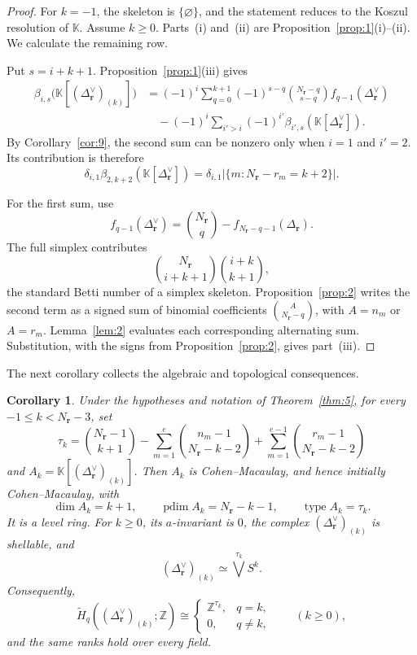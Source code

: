 \documentclass[11pt]{amsart}
\newtheorem{corollary}[theorem]{Corollary}
\theoremstyle{definition}
\theoremstyle{remark}
\newcommand{\K}{\mathbb K}
\newcommand{\SR}[1]{\K[#1]}
\DeclareMathOperator{\pdim}{pdim}
\begin{document}
	\begin{proof}
		For $k=-1$, the skeleton is $\{\varnothing\}$, and the statement reduces to the Koszul resolution of $\K$. Assume $k\ge0$. Parts~(i) and~(ii) are Proposition~\ref{prop:1}(i)--(ii). We calculate the remaining row.
		
		Put $s=i+k+1$. Proposition~\ref{prop:1}(iii) gives
		\begin{align*}
			\beta_{i,s}\bigl(\SR{(\Delta_{\mathbf r}^\vee)_{(k)}}\bigr)
			&=
			(-1)^i\sum_{q=0}^{k+1}(-1)^{s-q}
			\binom{N_{\mathbf r}-q}{s-q}f_{q-1}(\Delta_{\mathbf r}^\vee)\\
			&\quad-
			(-1)^i\sum_{i'>i}(-1)^{i'}
			\beta_{i',s}(\SR{\Delta_{\mathbf r}^\vee}).
		\end{align*}
		By Corollary~\ref{cor:9}, the second sum can be nonzero only when $i=1$ and $i'=2$. Its contribution is therefore
		\[
		\delta_{i,1}\beta_{2,k+2}(\SR{\Delta_{\mathbf r}^\vee})
		=
		\delta_{i,1}\bigl|\{m:N_{\mathbf r}-r_m=k+2\}\bigr|.
		\]
		
		For the first sum, use
		\[
		f_{q-1}(\Delta_{\mathbf r}^\vee)
		=
		\binom{N_{\mathbf r}}q-f_{N_{\mathbf r}-q-1}(\Delta_{\mathbf r}).
		\]
		The full simplex contributes
		\[
		\binom{N_{\mathbf r}}{i+k+1}\binom{i+k}{k+1},
		\]
		the standard Betti number of a simplex skeleton. Proposition~\ref{prop:2} writes the second term as a signed sum of binomial coefficients $\binom{A}{N_{\mathbf r}-q}$, with $A=n_m$ or $A=r_m$. Lemma~\ref{lem:2} evaluates each corresponding alternating sum. Substitution, with the signs from Proposition~\ref{prop:2}, gives part~(iii).
	\end{proof}
	
	The next corollary collects the algebraic and topological consequences.
	
	\begin{corollary}\label{cor:13}
		Under the hypotheses and notation of Theorem~\ref{thm:5}, for every $-1\le k<N_{\mathbf r}-3$, set
		\[
		\tau_k=
		\binom{N_{\mathbf r}-1}{k+1}
		-
		\sum_{m=1}^e\binom{n_m-1}{N_{\mathbf r}-k-2}
		+
		\sum_{m=1}^{e-1}\binom{r_m-1}{N_{\mathbf r}-k-2}
		\]
		and $A_k=\SR{(\Delta_{\mathbf r}^\vee)_{(k)}}$. Then $A_k$ is Cohen--Macaulay, and hence initially Cohen--Macaulay, with
		\[
		\dim A_k=k+1,
		\qquad
		\pdim A_k=N_{\mathbf r}-k-1,
		\qquad
		\operatorname{type}A_k=\tau_k.
		\]
		It is a level ring. For $k\ge0$, its $a$-invariant is $0$, the complex $(\Delta_{\mathbf r}^\vee)_{(k)}$ is shellable, and
		\[
		(\Delta_{\mathbf r}^\vee)_{(k)}
		\simeq
		\bigvee^{\tau_k}S^k.
		\]
		Consequently,
		\[
		\widetilde H_q((\Delta_{\mathbf r}^\vee)_{(k)};\mathbb Z)
		\cong
		\begin{cases}
			\mathbb Z^{\tau_k},&q=k,\\
			0,&q\ne k,
		\end{cases}
		\qquad(k\ge0),
		\]
		and the same ranks hold over every field.
	\end{corollary}
	
\end{document}
